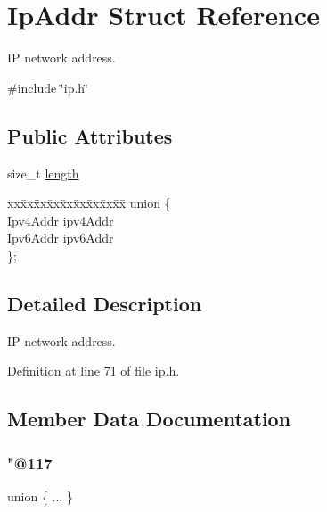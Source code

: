 \hypertarget{structIpAddr}{}\section{Ip\+Addr Struct Reference}
\label{structIpAddr}


IP network address.  




{\ttfamily \#include \char`\"{}ip.\+h\char`\"{}}

\subsection*{Public Attributes}
\begin{DoxyCompactItemize}
\item 
size\+\_\+t \hyperlink{structIpAddr_ae61478bd1e79361fca7dd04a21aeb2f8}{length}
\item 
\begin{tabbing}
xx\=xx\=xx\=xx\=xx\=xx\=xx\=xx\=xx\=\kill
union \{\\
\>\hyperlink{ipv4_8h_a411debb3d770caa0c06d3f73367da37f}{Ipv4Addr} \hyperlink{structIpAddr_a8de6f49cb0461f57c1eda49bb1088916}{ipv4Addr}\\
\>\hyperlink{ipv6_8h_aed0cbc40c61ed5b4fb681ebc55237e89}{Ipv6Addr} \hyperlink{structIpAddr_a9bc2340a9c0bc5a0b8aa9695b74e2ee6}{ipv6Addr}\\
\}; \\

\end{tabbing}\end{DoxyCompactItemize}


\subsection{Detailed Description}
IP network address. 

Definition at line 71 of file ip.\+h.



\subsection{Member Data Documentation}
\mbox{\label{structIpAddr_ad142c49bf2d59ac1f23da1b46b79be62}} 
\subsubsection{\texorpdfstring{"@117}{@117}}
{\footnotesize\ttfamily union \{ ... \} }

